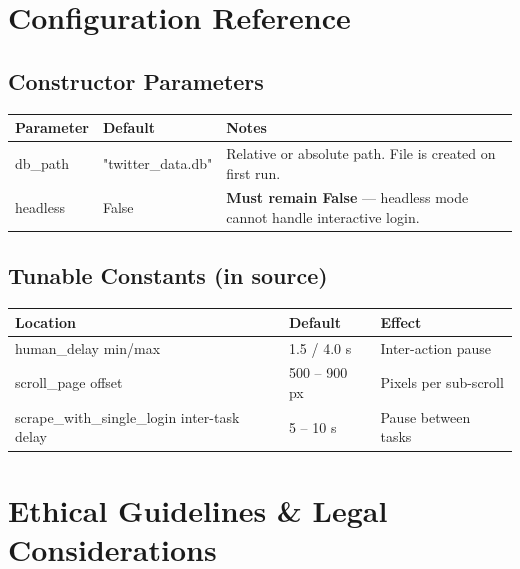 \documentclass[11pt, a4paper]{article}
\def\method#1{#1}%
\def\param#1{#1}%
\def\texttt#1{#1}%
\def\color#1{}%
\newcommand{\method}[1]{\texttt{\color{TwBlue}#1}}
\newcommand{\param}[1]{\texttt{\color{TwGreen!70!black}#1}}
\begin{document}
\section{Configuration Reference}

\subsection{Constructor Parameters}

\begin{center}
\begin{tabularx}{\linewidth}{llX}
\toprule
\textbf{Parameter} & \textbf{Default} & \textbf{Notes} \\
\midrule
\param{db\_path}  & \texttt{"twitter\_data.db"} & Relative or absolute path. File is created on first run. \\
\param{headless}  & \texttt{False}              & \textbf{Must remain \texttt{False}} --- headless mode cannot handle interactive login. \\
\bottomrule
\end{tabularx}
\end{center}

\subsection{Tunable Constants (in source)}

\begin{center}
\begin{tabular}{lll}
\toprule
\textbf{Location}               & \textbf{Default}  & \textbf{Effect} \\
\midrule
\method{human\_delay} min/max   & 1.5 / 4.0 s       & Inter-action pause \\
\method{scroll\_page} offset    & 500 -- 900 px      & Pixels per sub-scroll \\
\method{scrape\_with\_single\_login} inter-task delay & 5 -- 10 s & Pause between tasks \\
\bottomrule
\end{tabular}
\end{center}

\section{Ethical Guidelines \& Legal Considerations}
\end{document}
